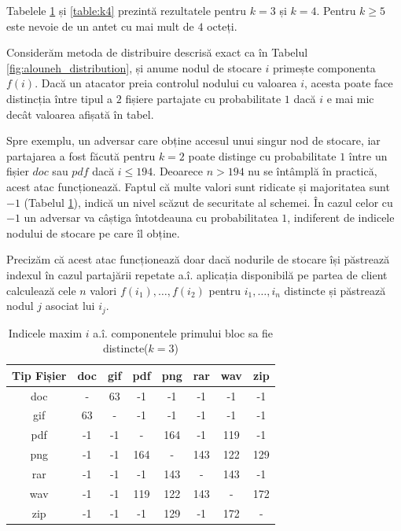 \documentclass[oneside, 12pt]{book}
\begin{document}
Tabelele {\ref{table:k3} și \ref{table:k4}} prezintă rezultatele pentru $k = 3$ și $k = 4$. Pentru $k \geq 5$ este nevoie de un antet cu mai mult de $4$ octeți.

Considerăm metoda de distribuire descrisă exact ca în Tabelul {\ref{fig:alouneh_distribution}}, și anume nodul de stocare $i$ primește componenta $f(i)$.
Dacă un atacator preia controlul nodului cu valoarea $i$, acesta poate face distincția între tipul a $2$ fișiere partajate cu probabilitate $1$ dacă $i$ e mai mic decât valoarea afișată în tabel.

Spre exemplu, un adversar care obține accesul unui singur nod de stocare, iar partajarea a fost făcută pentru $k=2$ poate distinge cu probabilitate $1$ între un fișier $doc$ sau $pdf$ dacă $i \leq 194$. Deoarece $n > 194$ nu se întâmplă în practică, acest atac funcționează. Faptul că multe valori sunt ridicate și majoritatea sunt $-1$ (Tabelul \ref{table:k3}), indică un nivel scăzut de securitate al schemei. În cazul celor cu $-1$ un adversar va câștiga întotdeauna cu probabilitatea $1$, indiferent de indicele nodului de stocare pe care îl obține.

Precizăm că acest atac funcționează doar dacă nodurile de stocare își păstrează indexul în cazul partajării repetate a.î. aplicația disponibilă pe partea de client calculează cele $n$ valori $f(i_1),\dots,f(i_2)$ pentru $i_1,\dots,i_n$ distincte și păstrează nodul $j$ asociat lui $i_j$.


\begin{table}[t]
\begin{center}
\caption{Indicele maxim $i$ a.î. componentele primului bloc sa fie distincte($k=3$)}\label{tb:margins}
\label{table:k3}
\begin{tabular}{cccccccc}
Tip Fișier & doc & gif & pdf & png & rar & wav & zip \\\hline
  doc & - & 63 & -1 & -1 & -1 & -1 & -1\\
  gif & 63 & - & -1 & -1 & -1 & -1 & -1\\
  pdf & -1 & -1 & - & 164 & -1 & 119 & -1\\
  png & -1 & -1 & 164 & - & 143 & 122 & 129\\
  rar & -1 & -1 & -1 & 143 & - & 143 & -1\\
  wav & -1 & -1 & 119 & 122 & 143 & - & 172\\
  zip & -1 & -1 & -1 & 129 & -1 & 172 & -\\ \hline
\end{tabular}
\end{center}
\bigskip
\end{table}
\end{document}

